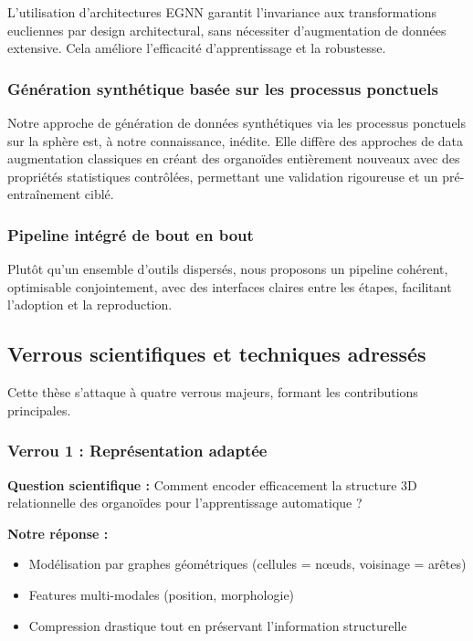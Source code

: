 L'utilisation d'architectures EGNN garantit l'invariance aux transformations eucliennes par design architectural, sans nécessiter d'augmentation de données extensive. Cela améliore l'efficacité d'apprentissage et la robustesse.

\subsubsection{Génération synthétique basée sur les processus ponctuels}

Notre approche de génération de données synthétiques via les processus ponctuels sur la sphère est, à notre connaissance, inédite. Elle diffère des approches de data augmentation classiques en créant des organoïdes entièrement nouveaux avec des propriétés statistiques contrôlées, permettant une validation rigoureuse et un pré-entraînement ciblé.

\subsubsection{Pipeline intégré de bout en bout}

Plutôt qu'un ensemble d'outils dispersés, nous proposons un pipeline cohérent, optimisable conjointement, avec des interfaces claires entre les étapes, facilitant l'adoption et la reproduction.

\subsection{Verrous scientifiques et techniques adressés}

Cette thèse s'attaque à quatre verrous majeurs, formant les contributions principales.

\subsubsection{Verrou 1 : Représentation adaptée}

\textbf{Question scientifique :} Comment encoder efficacement la structure 3D relationnelle des organoïdes pour l'apprentissage automatique ?

\textbf{Notre réponse :}
\begin{itemize}
    \item Modélisation par graphes géométriques (cellules = nœuds, voisinage = arêtes)
    \item Features multi-modales (position, morphologie)
    \item Compression drastique tout en préservant l'information structurelle
\end{itemize}

